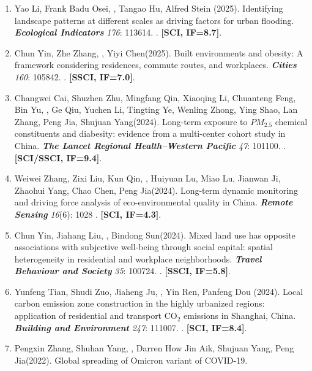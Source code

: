 \begin{enumerate}
\item
    Yao Li\CS, Frank Badu Osei, \Shaoqing, Tangao Hu, Alfred Stein (2025).
    Identifying landscape patterns at different scales as driving factors for urban flooding.
    \textbf{\textit{Ecological Indicators}} \textit{176}: 113614.
    . \textbf{[SCI, IF=8.7]}.
\item
    Chun Yin\CS, Zhe Zhang, \Shaoqing, Yiyi Chen\CS (2025).
    Built environments and obesity: A framework considering residences, commute routes, and workplaces.
    \textbf{\textit{Cities}} \textit{160}: 105842.
    . \textbf{[SSCI, IF=7.0]}.
\item
    Changwei Cai\CF, Shuzhen Zhu\CF, Mingfang Qin\CF, Xiaoqing Li\CF, Chuanteng Feng, Bin Yu, \Shaoqing, Ge Qiu, Yuchen Li, Tingting Ye, Wenling Zhong, Ying Shao, Lan Zhang, Peng Jia\CS, Shujuan Yang\CS (2024).
    Long-term exposure to $PM_{2.5}$ chemical constituents and diabesity: evidence from a multi-center cohort study in China. 
    \textbf{\textit{The Lancet Regional Health–Western Pacific}} \textit{47}: 101100.
    . \textbf{[SCI/SSCI, IF=9.4]}.
\item
    Weiwei Zhang, Zixi Liu, Kun Qin, \Shaoqing, Huiyuan Lu, Miao Lu, Jianwan Ji, Zhaohui Yang, Chao Chen, Peng Jia\CS (2024).
    Long-term dynamic monitoring and driving force analysis of eco-environmental quality in China. 
    \textbf{\textit{Remote Sensing}} \textit{16}(6): 1028
    . 
    \textbf{[SCI, IF=4.3]}.
\item
    Chun Yin, Jiahang Liu, \Shaoqing, Bindong Sun\CS (2024).
    Mixed land use has opposite associations with subjective well-being through social capital: spatial heterogeneity in residential and workplace neighborhoods.
    \textbf{\textit{Travel Behaviour and Society}} \textit{35}: 100724.
    . 
    \textbf{[SSCI, IF=5.8]}.
\item
    Yunfeng Tian, Shudi Zuo\CS, Jiaheng Ju, \Shaoqing, Yin Ren, Panfeng Dou (2024).
    Local carbon emission zone construction in the highly urbanized regions: application of residential and transport CO$_2$ emissions in Shanghai, China.
    \textbf{\textit{Building and Environment}} \textit{247}: 111007.
    . 
    \textbf{[SCI, IF=8.4]}.
\item
    Pengxin Zhang\CF, Shuhan Yang\CF, \Shaoqing, Darren How Jin Aik, Shujuan Yang, Peng Jia\CS (2022).
    Global spreading of Omicron variant of COVID-19.

\end{enumerate}
